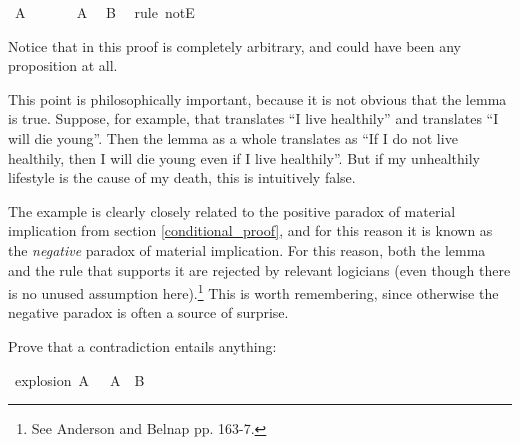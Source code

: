 \begin{isabellebody}
\ {\isachardoublequoteopen}A{\isachardoublequoteclose}\isanewline
\ \ \ \ \isamarkupfalse%
\ {\isacharbackquoteopen}{\isasymnot}\ A{\isacharbackquoteclose}\ \isamarkupfalse%
\ B\ \isamarkupfalse%
\ {\isacharparenleft}rule\ notE{\isacharparenright}\isanewline
\ \ \isamarkupfalse%
\isanewline
{}\isamarkupfalse%
%
\endisatagproof
{\isafoldproof}%
%
\isadelimproof
%
\endisadelimproof
%
\begin{isamarkuptext}%
Notice that  in this proof is completely arbitrary, and could have been any
proposition at all.%
\end{isamarkuptext}\isamarkuptrue%
%
\begin{isamarkuptext}%
This point is philosophically important, because it is not obvious that the lemma is true.
Suppose, for example, that  translates ``I live healthily'' and  translates ``I
will die young''. Then the lemma as a whole translates as ``If I do not live healthily, then I will
die young even if I live healthily''. But if my unhealthily lifestyle is the cause of my death,
this is intuitively false.%
\end{isamarkuptext}\isamarkuptrue%
%
\begin{isamarkuptext}%
The example is clearly closely related to the positive paradox of material implication from
section \ref{conditional_proof}, and for this reason it is known as the \emph{negative} paradox of
material implication. For this reason, both the lemma and the rule that supports it are rejected by
relevant logicians (even though there is no unused assumption here).\footnote{See Anderson and Belnap
\cite{anderson_entailment_1976} pp. 163-7.}
This is worth remembering, since otherwise the negative paradox is often a source of surprise.%
\end{isamarkuptext}\isamarkuptrue%
%
\begin{isamarkuptext}%
\begin{Exercise}[title = Explosion, label = explosion] Prove that a contradiction entails anything: \end{Exercise}%
\end{isamarkuptext}\isamarkuptrue%
\isamarkupfalse%
\ explosion{\isacharcolon}\ {\isachardoublequoteopen}A\ {\isasymand}\ {\isasymnot}\ A\ {\isasymlongrightarrow}\ B{\isachardoublequoteclose}%
\isadelimproof
\ %
\endisadelimproof
%
\isatagproof
{}\isamarkupfalse%
%
\endisatagproof
{\isafoldproof}%
%
\isadelimproof
%
\endisadelimproof
%

\end{isabellebody}
